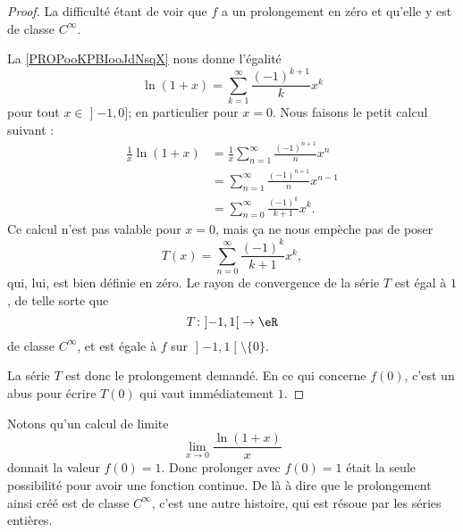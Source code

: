 \begin{proof}
    La difficulté étant de voir que \( f\) a un prolongement en zéro et qu'elle y est de classe \(  C^{\infty}\).

    La \ref{PROPooKPBIooJdNsqX} nous donne l'égalité
    \begin{equation}
        \ln(1+x)=\sum_{k=1}^{\infty}\frac{ (-1)^{k+1} }{ k }x^k
    \end{equation}
    pour tout \( x\in \mathopen] -1 , 0 \mathclose]\); en particulier pour \( x=0\). Nous faisons le petit calcul suivant :
    \begin{subequations}        \label{SUBEQooRLQOooEzNFDp}
        \begin{align}
            \frac{1}{ x }\ln(1+x)&= \frac{1}{ x }\sum_{n=1}^{\infty}\frac{ (-1)^{n+1} }{ n }x^n\\
            &=\sum_{n=1}^{\infty}\frac{ (-1)^{n+1} }{ n }x^{n-1}\\
            &=\sum_{n=0}^{\infty}\frac{ (-1)^k }{ k+1 }x^k.
        \end{align}
    \end{subequations}
    Ce calcul n'est pas valable pour \( x=0\), mais ça ne nous empèche pas de poser
    \begin{equation}
        T(x)=\sum_{n=0}^{\infty}\frac{ (-1)^k }{ k+1 }x^k,
    \end{equation}
    qui, lui, est bien définie en zéro. Le rayon de convergence de la série \( T\) est égal à \( 1\), de telle sorte que
    \begin{equation}
        T\colon \mathopen] -1 , 1 \mathclose[\to \eR \\
    \end{equation}
    de classe \(  C^{\infty}\), et est égale à \( f\) sur \( \mathopen] -1 , 1 \mathclose[\setminus\{ 0 \}\).

    La série \( T\) est donc le prolongement demandé. En ce qui concerne \( f(0)\), c'est un abus pour écrire \( T(0)\) qui vaut immédiatement \( 1\).
\end{proof}

Notons qu'un calcul de limite
\begin{equation}
    \lim_{x\to 0} \frac{ \ln(1+x) }{ x }
\end{equation}
donnait la valeur \( f(0)=1\). Donc prolonger avec \( f(0)=1\) était la seule possibilité pour avoir une fonction continue. De là à dire que le prolongement ainsi créé est de classe \(  C^{\infty}\), c'est une autre histoire, qui est résoue par les séries entières.

